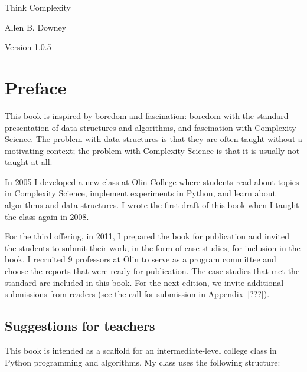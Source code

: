 \documentclass[10pt]{book}
\newcommand{\thetitle}{Think Complexity}
\newcommand{\theversion}{1.0.5}
\begin{document}

\begin{htmlonly}


{\Large \thetitle}

{\large Allen B. Downey}

Version \theversion

\setcounter{chapter}{-1}

\end{htmlonly}

\fi

\chapter{Preface}

This book is inspired by boredom and fascination: boredom with the
standard presentation of data structures and algorithms, and
fascination with Complexity Science.  The problem with data structures
is that they are often taught without a motivating context; the
problem with Complexity Science is that it is usually not taught at
all.

In 2005 I developed a new class at Olin College where students
read about topics in Complexity Science, implement experiments in
Python, and learn about algorithms and data structures.  I wrote
the first draft of this book when I taught the class again in 2008.

For the third offering, in 2011, I prepared the book for publication
and invited the students to submit their work, in the form of case
studies, for inclusion in the book.  I recruited 9 professors at Olin
to serve as a program committee and choose the reports that were ready
for publication.  The case studies that met the standard are included
in this book.  For the next edition, we invite additional submissions
from readers (see the call for submission in Appendix~\ref{???}).

\section{Suggestions for teachers}

This book is intended as a scaffold for an intermediate-level college
class in Python programming and algorithms.  My class uses the following
structure:
\end{document}
